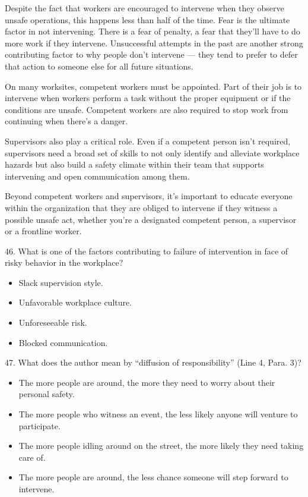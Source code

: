 \documentclass[UTF8,11pt]{ctexart}
\begin{document}
Despite the fact that workers are encouraged to intervene when they observe unsafe operations, this happens less than half of the time. Fear is the ultimate factor in not intervening. There is a fear of penalty, a fear that they’ll have to do more work if they intervene. Unsuccessful attempts in the past are another strong contributing factor to why people don’t intervene — they tend to prefer to defer that action to someone else for all future situations.


On many worksites, competent workers must be appointed. Part of their job is to intervene when workers perform a task without the proper equipment or if the conditions are unsafe. Competent workers are also required to stop work from continuing when there’s a danger.


Supervisors also play a critical role. Even if a competent person isn’t required, supervisors need a broad set of skills to not only identify and alleviate workplace hazards but also build a safety climate within their team that supports intervening and open communication among them.


Beyond competent workers and supervisors, it’s important to educate everyone within the organization that they are obliged to intervene if they witness a possible unsafe act, whether you’re a designated competent person, a supervisor or a frontline worker.


46. What is one of the factors contributing to failure of intervention in face of risky behavior in the workplace?


\begin{itemize}[leftmargin=2em,itemsep=.2em,topsep=.4em]\item[A.] Slack supervision style.
\item[B.] Unfavorable workplace culture.
\item[C.] Unforeseeable risk.
\item[D.] Blocked communication.
\end{itemize}

47. What does the author mean by “diffusion of responsibility” (Line 4, Para. 3)?


\begin{itemize}[leftmargin=2em,itemsep=.2em,topsep=.4em]\item[A.] The more people are around, the more they need to worry about their personal safety.
\item[B.] The more people who witness an event, the less likely anyone will venture to participate.
\item[C.] The more people idling around on the street, the more likely they need taking care of.
\item[D.] The more people are around, the less chance someone will step forward to intervene.
\end{itemize}
\end{document}
